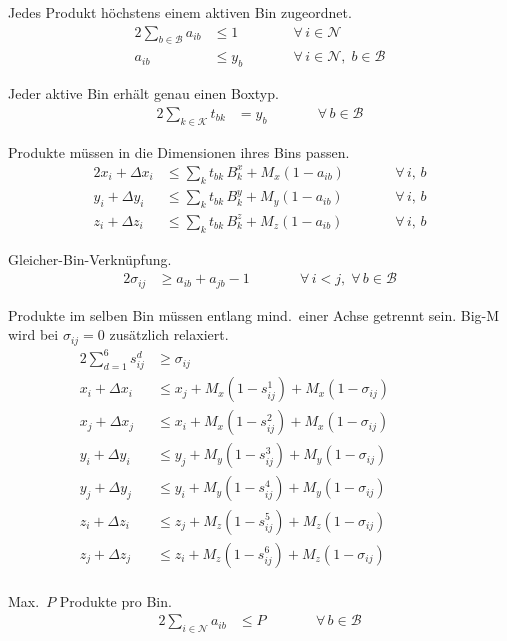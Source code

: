 \documentclass[10pt]{article}
\newcommand{\NN}{\mathcal{N}}
\newcommand{\BB}{\mathcal{B}}
\newcommand{\KK}{\mathcal{K}}
\begin{document}
Jedes Produkt h\"ochstens einem aktiven Bin zugeordnet.
\begin{alignat*}{2}
\sum_{b \in \BB} a_{ib} &\leq 1
  &\qquad& \forall\, i \in \NN \\
a_{ib} &\leq y_b
  && \forall\, i \in \NN,\; b \in \BB
\end{alignat*}

Jeder aktive Bin erh\"alt genau einen Boxtyp.
\begin{alignat*}{2}
\sum_{k \in \KK} t_{bk} &= y_b
  &\qquad& \forall\, b \in \BB
\end{alignat*}

Produkte m\"ussen in die Dimensionen ihres Bins passen.
\begin{alignat*}{2}
x_i + \Delta x_i &\leq \textstyle\sum_k t_{bk}\, B_k^x + M_x(1 - a_{ib})
  &\qquad& \forall\, i,\, b \\
y_i + \Delta y_i &\leq \textstyle\sum_k t_{bk}\, B_k^y + M_y(1 - a_{ib})
  && \forall\, i,\, b \\
z_i + \Delta z_i &\leq \textstyle\sum_k t_{bk}\, B_k^z + M_z(1 - a_{ib})
  && \forall\, i,\, b
\end{alignat*}

Gleicher-Bin-Verkn\"upfung.
\begin{alignat*}{2}
\sigma_{ij} &\geq a_{ib} + a_{jb} - 1
  &\qquad& \forall\, i < j,\; \forall\, b \in \BB
\end{alignat*}

Produkte im selben Bin m\"ussen entlang mind.\ einer Achse getrennt sein.
Big-M wird bei $\sigma_{ij} = 0$ zus\"atzlich relaxiert.
\begin{alignat*}{2}
\textstyle\sum_{d=1}^{6} s_{ij}^d &\geq \sigma_{ij}
  &\qquad& \\[4pt]
x_i + \Delta x_i &\leq x_j + M_x(1 - s_{ij}^1) + M_x(1 - \sigma_{ij}) \\
x_j + \Delta x_j &\leq x_i + M_x(1 - s_{ij}^2) + M_x(1 - \sigma_{ij}) \\
y_i + \Delta y_i &\leq y_j + M_y(1 - s_{ij}^3) + M_y(1 - \sigma_{ij}) \\
y_j + \Delta y_j &\leq y_i + M_y(1 - s_{ij}^4) + M_y(1 - \sigma_{ij}) \\
z_i + \Delta z_i &\leq z_j + M_z(1 - s_{ij}^5) + M_z(1 - \sigma_{ij}) \\
z_j + \Delta z_j &\leq z_i + M_z(1 - s_{ij}^6) + M_z(1 - \sigma_{ij}) \\
\end{alignat*}

Max.\ $P$ Produkte pro Bin.
\begin{alignat*}{2}
\sum_{i \in \NN} a_{ib} &\leq P
  &\qquad& \forall\, b \in \BB
\end{alignat*}
\end{document}
